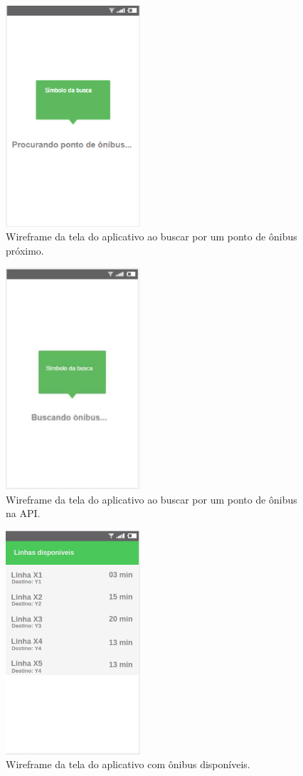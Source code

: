 \documentclass[
	12pt,				%
	oneside,			%
	a4paper,			%
	brazil				%
]{abntex2}
\begin{document}
\begin{apendicesenv}
\begin{figure}[!h]
\centering
\includegraphics[width=5cm, center]{images/tela-1-buscando-beacon.PNG}
\caption{Wireframe da tela do aplicativo ao buscar por um ponto de ônibus próximo.}
\label{Rotulo}
\end{figure}

\begin{figure}[!h]
\centering
\includegraphics[width=5cm, center]{images/tela-2-buscando-ponto.PNG}
\caption{Wireframe da tela do aplicativo ao buscar por um ponto de ônibus na API.}
\label{Rotulo}
\end{figure}

\begin{figure}[!h]
\centering
\includegraphics[width=5cm, center]{images/tela-3-lista-de-onibus.PNG}
\caption{Wireframe da tela do aplicativo com ônibus disponíveis.}
\label{Rotulo}
\end{figure}


\end{apendicesenv}
\end{document}
